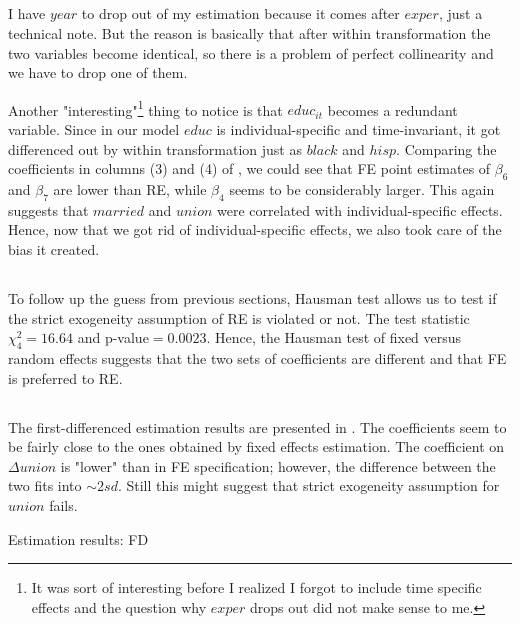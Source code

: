 \documentclass[]{article}
\begin{document}
\subsection{}
I have $year$ to drop out of my estimation because it comes after $exper$, just a technical note. But the reason is basically that after within transformation the two variables become identical, so there is a problem of perfect collinearity and we have to drop one of them.

Another "interesting"\footnote{It was sort of interesting before I realized I forgot to include time specific effects and the question why $exper$ drops out did not make sense to me.} thing to notice is that $educ_{it}$ becomes a redundant variable. Since in our model $educ$ is individual-specific and time-invariant, it got differenced out by within transformation just as $black$ and $hisp$. Comparing the coefficients in columns (3) and (4) of , we could see that FE point estimates of $\beta_6$ and $\beta_7$ are lower than RE, while $\beta_4$ seems to be considerably larger. This again suggests that $married$ and $union$ were correlated with individual-specific effects. Hence, now that we got rid of individual-specific effects, we also took care of the bias it created.

\subsection{}
To follow up the guess from previous sections, Hausman test allows us to test if the strict exogeneity assumption of RE is violated or not. The test statistic $\chi^2_4 = 16.64$ and p-value$ = 0.0023$. Hence, the Hausman test of fixed versus random effects suggests that the two sets of coefficients are different and that FE is preferred to RE.

\subsection{}
The first-differenced estimation results are presented in . The coefficients seem to be fairly close to the ones obtained by fixed effects estimation. The coefficient on $\Delta union$ is "lower" than in FE specification; however, the difference between the two fits into $\sim 2sd$. Still this might suggest that strict exogeneity assumption for $union$ fails.

\begin{table}[h]
	\centering
	
	\caption{Estimation results: FD}
	\label{tab:ex2estresfd}
\end{table}
\end{document}
